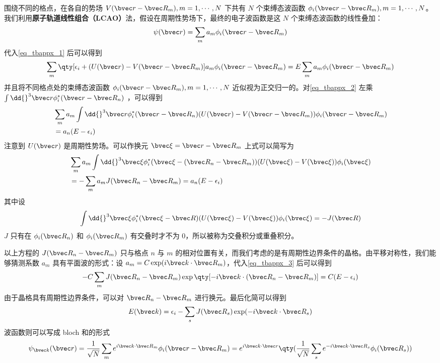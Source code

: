 围绕不同的格点，在各自的势场 $V(\bvec r-\bvec R_m),m=1,\cdots,N$ 下共有 $N$ 个束缚态波函数 $\phi_i(\bvec r-\bvec R_m),m=1,\cdots,N$。我们利用\textbf{原子轨道线性组合（LCAO）}法，假设在周期性势场下，最终的电子波函数是这 $N$ 个束缚态波函数的线性叠加：
\begin{equation}
\psi(\bvec r)=\sum_{m} a_m \phi_i(\bvec r-\bvec R_m)
\end{equation}
代入\autoref{eq_tbappx_1} 后可以得到
\begin{equation}\label{eq_tbappx_2}
\sum_{m}\qty[\epsilon_i+(U(\bvec r)-V(\bvec r-\bvec R_m)]a_m\phi_i(\bvec r-\bvec R_m)=E\sum_{m} a_m\phi_i(\bvec r-\bvec R_m)
\end{equation}
并且将不同格点处的束缚态波函数 $\phi_i(\bvec r-\bvec R_m),m=1,\cdots,N$ 近似视为正交归一的。对\autoref{eq_tbappx_2} 左乘 $\int \dd{}^3 \bvec r\phi_i^*(\bvec r-\bvec R_n)$ ，可以得到
\begin{equation}
\begin{aligned}
&\sum_m a_m \int \dd{}^3 \bvec r \phi_i^*(\bvec r-\bvec R_n)(U(\bvec r)-V(\bvec r-\bvec R_m))\phi_i(\bvec r-\bvec R_m)\\
&=a_n(E-\epsilon_i)
\end{aligned}
\end{equation}
注意到 $U(\bvec r)$ 是周期性势场。可以作换元  $\bvec \xi=\bvec r-\bvec R_m$ 上式可以简写为
\begin{equation}\label{eq_tbappx_3}
\begin{aligned}
&\sum_m a_m \int \dd{}^3 \bvec \xi \phi_i^*(\bvec \xi-(\bvec R_n-\bvec R_m))(U(\bvec \xi)-V(\bvec \xi))\phi_i(\bvec \xi)
\\
&=-\sum_m a_m J(\bvec R_n-\bvec R_m)=a_n(E-\epsilon_i)
\end{aligned}
\end{equation}
其中设
\begin{equation}\label{eq_tbappx_5}
\int \dd{}^3 \bvec \xi \phi_i^*(\bvec \xi-\bvec R)(U(\bvec \xi)-V(\bvec \xi))\phi_i(\bvec \xi)=-J(\bvec R)
\end{equation}
$J$ 只有在 $\phi_i(\bvec R_n)$ 和 $\phi_i(\bvec R_m)$ 有交叠时才不为 $0$，所以被称为交叠积分或重叠积分。

以上方程的 $J(\bvec R_n-\bvec R_m)$ 只与格点 $n$ 与 $m$ 的相对位置有关，而我们考虑的是有周期性边界条件的晶格。由平移对称性，我们能够猜测系数 $a_m$ 具有平面波的形式：设 $a_m=C\exp(i \bvec k\cdot \bvec R_m)$，代入\autoref{eq_tbappx_3} 后可以得到
\begin{equation}
-C\sum_m J(\bvec R_n-\bvec R_m)\exp\qty[-i\bvec k\cdot (\bvec R_n-\bvec R_m)]=C(E-\epsilon_i)
\end{equation}
由于晶格具有周期性边界条件，可以对 $\bvec R_n-\bvec R_m$ 进行换元。最后化简可以得到
\begin{equation}\label{eq_tbappx_4}
E(\bvec k)=\epsilon_i-\sum_s J(\bvec R_s)\exp(-i\bvec k\cdot \bvec R_s)
\end{equation}
波函数则可以写成 bloch 和的形式
\begin{equation}
\psi_{\bvec k}(\bvec r)=\frac{1}{\sqrt{N}}\sum_m e^{i\bvec k\cdot \bvec R_m}\phi_i(\bvec r-\bvec R_m)=e^{i\bvec k\cdot \bvec r}\qty(\frac{1}{\sqrt{N}}\sum_s e^{-i\bvec k\cdot \bvec R_s}\phi_i(\bvec R_s))
\end{equation}

